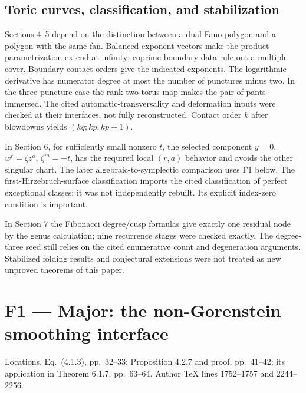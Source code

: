 \documentclass[10pt]{article}
\begin{document}
\subsection*{Toric curves, classification, and stabilization}
Sections 4–5 depend on the distinction between a dual Fano polygon and a polygon with the same fan. Balanced exponent vectors make the product parametrization extend at infinity; coprime boundary data rule out a multiple cover. Boundary contact orders give the indicated exponents. The logarithmic derivative has numerator degree at most the number of punctures minus two. In the three-puncture case the rank-two torus map makes the pair of pants immersed. The cited automatic-transversality and deformation inputs were checked at their interfaces, not fully reconstructed. Contact order \(k\) after blowdowns yields \((kq;kp,kp+1)\).\par
In Section 6, for sufficiently small nonzero \(t\), the selected component \(y=0\), \(w^r=\zeta z^a\), \(\zeta^m=-t\), has the required local \((r,a)\) behavior and avoids the other singular chart. The later algebraic-to-symplectic comparison uses F1 below. The first-Hirzebruch-surface classification imports the cited classification of perfect exceptional classes; it was not independently rebuilt. Its explicit index-zero condition is important.\par
In Section 7 the Fibonacci degree/cusp formulas give exactly one residual node by the genus calculation; nine recurrence stages were checked exactly. The degree-three seed still relies on the cited enumerative count and degeneration arguments. Stabilized folding results and conjectural extensions were not treated as new unproved theorems of this paper.\par
\section*{F1 — Major: the non-Gorenstein smoothing interface}
Locations. Eq. (4.1.3), pp. 32–33; Proposition 4.2.7 and proof, pp. 41–42; its application in Theorem 6.1.7, pp. 63–64. Author TeX lines 1752–1757 and 2244–2256.\par
\end{document}
